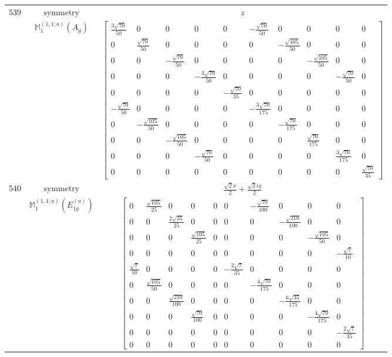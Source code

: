 \documentclass[fleqn,8pt,landscape]{jsarticle}
\begin{document}
\begin{longtable}{ccc}
$ 539 $ & $ \text{symmetry} $ & $ z $ \\
$  $ & $ \mathbb{M}_{1}^{(1,1;a)}(A_{g}) $ & $ \begin{bmatrix} \frac{3 \sqrt{70}}{50} & 0 & 0 & 0 & 0 & - \frac{\sqrt{70}}{50} & 0 & 0 & 0 & 0 \\ 0 & \frac{\sqrt{70}}{50} & 0 & 0 & 0 & 0 & - \frac{\sqrt{105}}{50} & 0 & 0 & 0 \\ 0 & 0 & - \frac{\sqrt{70}}{50} & 0 & 0 & 0 & 0 & - \frac{\sqrt{105}}{50} & 0 & 0 \\ 0 & 0 & 0 & - \frac{3 \sqrt{70}}{50} & 0 & 0 & 0 & 0 & - \frac{\sqrt{70}}{50} & 0 \\ 0 & 0 & 0 & 0 & - \frac{\sqrt{70}}{35} & 0 & 0 & 0 & 0 & 0 \\ - \frac{\sqrt{70}}{50} & 0 & 0 & 0 & 0 & - \frac{3 \sqrt{70}}{175} & 0 & 0 & 0 & 0 \\ 0 & - \frac{\sqrt{105}}{50} & 0 & 0 & 0 & 0 & - \frac{\sqrt{70}}{175} & 0 & 0 & 0 \\ 0 & 0 & - \frac{\sqrt{105}}{50} & 0 & 0 & 0 & 0 & \frac{\sqrt{70}}{175} & 0 & 0 \\ 0 & 0 & 0 & - \frac{\sqrt{70}}{50} & 0 & 0 & 0 & 0 & \frac{3 \sqrt{70}}{175} & 0 \\ 0 & 0 & 0 & 0 & 0 & 0 & 0 & 0 & 0 & \frac{\sqrt{70}}{35} \end{bmatrix} $ \\ \hline
$ 540 $ & $ \text{symmetry} $ & $ \frac{\sqrt{2} x}{2} + \frac{\sqrt{2} i y}{2} $ \\
$  $ & $ \mathbb{M}_{1}^{(1,1;a)}(E_{1g}^{(a)}) $ & $ \begin{bmatrix} 0 & \frac{\sqrt{105}}{25} & 0 & 0 & 0 & 0 & - \frac{\sqrt{70}}{100} & 0 & 0 & 0 \\ 0 & 0 & \frac{2 \sqrt{35}}{25} & 0 & 0 & 0 & 0 & - \frac{\sqrt{210}}{100} & 0 & 0 \\ 0 & 0 & 0 & \frac{\sqrt{105}}{25} & 0 & 0 & 0 & 0 & - \frac{\sqrt{105}}{50} & 0 \\ 0 & 0 & 0 & 0 & 0 & 0 & 0 & 0 & 0 & - \frac{\sqrt{7}}{10} \\ \frac{\sqrt{7}}{10} & 0 & 0 & 0 & 0 & - \frac{2 \sqrt{7}}{35} & 0 & 0 & 0 & 0 \\ 0 & \frac{\sqrt{105}}{50} & 0 & 0 & 0 & 0 & - \frac{4 \sqrt{70}}{175} & 0 & 0 & 0 \\ 0 & 0 & \frac{\sqrt{210}}{100} & 0 & 0 & 0 & 0 & - \frac{6 \sqrt{35}}{175} & 0 & 0 \\ 0 & 0 & 0 & \frac{\sqrt{70}}{100} & 0 & 0 & 0 & 0 & - \frac{4 \sqrt{70}}{175} & 0 \\ 0 & 0 & 0 & 0 & 0 & 0 & 0 & 0 & 0 & - \frac{2 \sqrt{7}}{35} \\ 0 & 0 & 0 & 0 & 0 & 0 & 0 & 0 & 0 & 0 \end{bmatrix} $ \\ \hline

\end{longtable}
\end{document}
